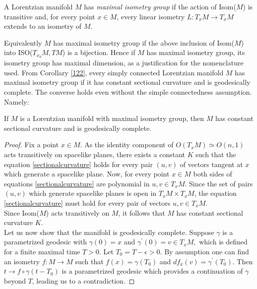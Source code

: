 \begin{definition}
    A Lorentzian manifold $M$ has \textit{maximal isometry group} if the action of Isom($M$) is transitive and, for every point $x \in M$, every linear isometry $L:T_{x}M\to T_xM$ extends to an isometry of $M$. 
\end{definition}

Equivalently $M$ has maximal isometry group if the above inclusion of Isom($M$) into ISO($T_{x_0}M, TM$) is a bijection. Hence if $M$ has maximal isometry group, its isometry group has maximal dimension, as a justification for the nomenclature used. 
From Corollary \ref{122}, every simply connected Lorentzian manifold $M$ has maximal isometry group if it has constant sectional curvature and is geodesically complete. The converse holds even without the simple connectedness assumption. Namely: 

\begin{lemma}\label{maximalisometry}
    If $M$ is a Lorentzian manifold with maximal isometry group, then $M$ has constant sectional curvature and is geodesically complete.
\end{lemma}

\begin{proof}
    Fix a point $x\in M$. As the identity component of $O(T_x M)\simeq O(n,1)$ acts transitively on spacelike planes, there exists a constant $K$ such that the equation \ref{sectionalcurvature} holds for every pair $(u,v)$ of vectors tangent at $x$ which generate a spacelike plane. Now, for every point $x\in M$ both sides of equations \ref{sectionalcurvature} are polynomial in $u,v \in T_xM$. Since the set of pairs $(u,v)$ which generate spacelike planes is open in $T_{x}M\times T_{x}M$, the equation \ref{sectionalcurvature} must hold for every pair of vectors $u,v \in T_xM$.\\ Since Isom($M$) acts transitively on $M$, it follows that $M$ has constant sectional curvature $K$.\\
    Let us now show that the manifold is geodesically complete. Suppose $\gamma$ is a parametrized geodesic with $\gamma(0)=x$ and $\gamma^{\prime} (0)=v\in T_xM,$ which is defined for a finite maximal time $T>0.$ Let $T_0=T-\epsilon>0.$ By assumption one can find an isometry $f:M\to M$ such that $f(x)=\gamma(T_0)$ and $df_x(v)=\gamma^{\prime}(T_0).$ Then $t\to f\circ\gamma(t-T_0)$ is a parametrized geodesic which provides a continuation of $\gamma$ beyond $T$, leading us to a contradiction. 
\end{proof}

